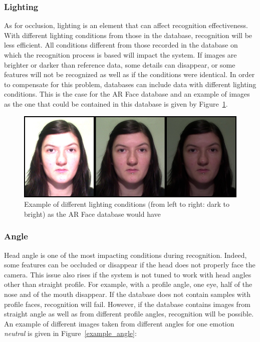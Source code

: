 \subsubsection{Lighting}

\vspace{\baselineskip}
\noindent As for occlusion, lighting is an element that can affect recognition effectiveness. With different lighting conditions from those in the database, recognition will be less efficient. All conditions different from those recorded  in the database on which the recognition process is based will impact the system. If images are brighter or darker than reference data, some details can disappear, or some features will not be recognized as well as if the conditions were identical. In order to compensate for this problem, databases can include data with different lighting conditions. This is the case for the AR Face database \cite{ARFACE} and an example of images as the one that could be contained in this database is given by Figure~\ref{arface_example1}.
\newline

\begin{figure}[!h]
\begin{center}
\noindent \includegraphics[scale=0.5]{figures/arface_example1} 
\newline
\caption{Example of different lighting conditions (from left to right: dark to bright) as the AR Face database would have}
\label{arface_example1}
\end{center} 
\end{figure}

\subsubsection{Angle}

\vspace{\baselineskip}
\noindent Head angle is one of the most impacting conditions during recognition. Indeed, some features can be occluded or disappear if the head does not properly face the camera. This issue also rises if the system is not tuned to work with head angles other than straight profile. For example, with a profile angle, one eye, half of the nose and of the mouth disappear. If the database does not contain samples with profile faces, recognition will fail. However, if the database contains images from straight angle as well as from different profile angles, recognition will be possible. An example of different images taken from different angles for one emotion \textit{neutral} is given in Figure~\ref{example_angle}:
\newline

